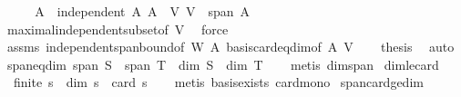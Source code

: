 \begin{isabellebody}
%
\isadelimproof
%
\endisadelimproof
%
\isatagproof
{}\isamarkupfalse%
\ {\isacharminus}{\kern0pt}\isanewline
\ \ \isamarkupfalse%
\ A\ \ {\isachardoublequoteopen}independent\ A{\isachardoublequoteclose}\ {\isachardoublequoteopen}A\ {\isasymsubseteq}\ V{\isachardoublequoteclose}\ {\isachardoublequoteopen}V\ {\isasymsubseteq}\ span\ A{\isachardoublequoteclose}\isanewline
\ \ \ \ \isamarkupfalse%
\ maximal{\isacharunderscore}{\kern0pt}independent{\isacharunderscore}{\kern0pt}subset{\isacharbrackleft}{\kern0pt}of\ V{\isacharbrackright}{\kern0pt}\ \isamarkupfalse%
\ force\isanewline
\ \ \isamarkupfalse%
\ assms\ independent{\isacharunderscore}{\kern0pt}span{\isacharunderscore}{\kern0pt}bound{\isacharbrackleft}{\kern0pt}of\ W\ A{\isacharbrackright}{\kern0pt}\ basis{\isacharunderscore}{\kern0pt}card{\isacharunderscore}{\kern0pt}eq{\isacharunderscore}{\kern0pt}dim{\isacharbrackleft}{\kern0pt}of\ A\ V{\isacharbrackright}{\kern0pt}\isanewline
\ \ \isamarkupfalse%
\ {\isacharquery}{\kern0pt}thesis\ \isamarkupfalse%
\ auto\isanewline
{}\isamarkupfalse%
%
\endisatagproof
{\isafoldproof}%
%
\isadelimproof
\isanewline
%
\endisadelimproof
\isanewline
{}\isamarkupfalse%
\ span{\isacharunderscore}{\kern0pt}eq{\isacharunderscore}{\kern0pt}dim{\isacharcolon}{\kern0pt}\ {\isachardoublequoteopen}span\ S\ {\isacharequal}{\kern0pt}\ span\ T\ {\isasymLongrightarrow}\ dim\ S\ {\isacharequal}{\kern0pt}\ dim\ T{\isachardoublequoteclose}\isanewline
%
\isadelimproof
\ \ %
\endisadelimproof
%
\isatagproof
{}\isamarkupfalse%
\ {\isacharparenleft}{\kern0pt}metis\ dim{\isacharunderscore}{\kern0pt}span{\isacharparenright}{\kern0pt}%
\endisatagproof
{\isafoldproof}%
%
\isadelimproof
\isanewline
%
\endisadelimproof
\isanewline
{}\isamarkupfalse%
\ dim{\isacharunderscore}{\kern0pt}le{\isacharunderscore}{\kern0pt}card{\isacharprime}{\kern0pt}{\isacharcolon}{\kern0pt}\isanewline
\ \ {\isachardoublequoteopen}finite\ s\ {\isasymLongrightarrow}\ dim\ s\ {\isasymle}\ card\ s{\isachardoublequoteclose}\isanewline
%
\isadelimproof
\ \ %
\endisadelimproof
%
\isatagproof
{}\isamarkupfalse%
\ {\isacharparenleft}{\kern0pt}metis\ basis{\isacharunderscore}{\kern0pt}exists\ card{\isacharunderscore}{\kern0pt}mono{\isacharparenright}{\kern0pt}%
\endisatagproof
{\isafoldproof}%
%
\isadelimproof
\isanewline
%
\endisadelimproof
\isanewline
{}\isamarkupfalse%
\ span{\isacharunderscore}{\kern0pt}card{\isacharunderscore}{\kern0pt}ge{\isacharunderscore}{\kern0pt}dim{\isacharcolon}{\kern0pt}\isanewline

\end{isabellebody}

